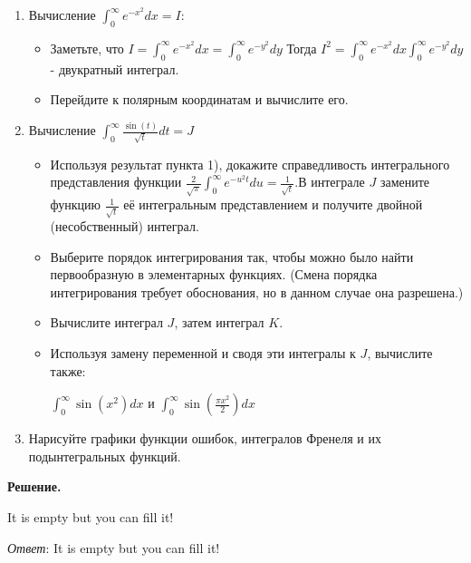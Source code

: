 \begin{enumerate}
    \item Вычисление $\int^\infty_0 e^{-x^2} dx = I$:
    \begin{itemize}
        \item Заметьте, что $\displaystyle I = \int^\infty_0 e^{-x^2} dx = \int_0^\infty e^{-y^2} dy$
        Тогда $\displaystyle I^2 = \int^\infty_0 e^{-x^2} dx \int_0^\infty e^{-y^2} dy$ - двукратный интеграл.

        \item Перейдите к полярным координатам и вычислите его.
    \end{itemize}

    \item Вычисление $\displaystyle \int_0^\infty \frac{\sin(t)}{\sqrt{t}} dt = J$
    \begin{itemize}
        \item Используя результат пункта 1), докажите справедливость интегрального представления функции
        $\displaystyle \frac{2}{\sqrt{\pi}} \int_0^\infty e^{-u^2 t} du = \frac{1}{\sqrt{t}}$.В интеграле $J$ замените функцию $\frac{1}{\sqrt{t}}$ её интегральным представлением и получите двойной (несобственный) интеграл.

        \item Выберите порядок интегрирования так, чтобы можно было найти первообразную в элементарных функциях.
        (Смена порядка интегрирования требует обоснования, но в данном случае она разрешена.)

        \item Вычислите интеграл $J$, затем интеграл $K$.

        \item Используя замену переменной и сводя эти интегралы к $J$, вычислите также:

        $\displaystyle \int_0^\infty \sin(x^2) dx$ и $\displaystyle \int_0^\infty \sin(\frac{\pi x^2}{2}) dx$

    \end{itemize}

    \item Нарисуйте графики функции ошибок, интегралов Френеля и их подынтегральных функций.

\end{enumerate}

\vspace{10mm}
\textbf{Решение.}

It is empty but you can fill it!

\textit{Ответ}: It is empty but you can fill it!
\clearpage
